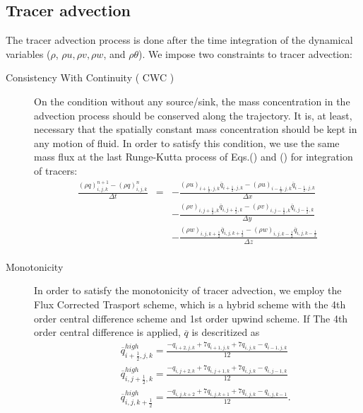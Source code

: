 \subsection{Tracer advection}
The tracer advection process is done after the time integration of 
the dynamical variables ($\rho$, $\rho u,\rho v,\rho w$, and $\rho \theta$).
We impose two constraints to tracer advection:
\begin{description}
\item[Consistency With Continuity ( CWC )]
On the condition without any source/sink,
the mass concentration in the advection process 
should be conserved along the trajectory.
It is, at least,  necessary that 
the spatially constant mass concentration should be kept
in any motion of fluid.
In order to satisfy this condition, we use the same mass flux at the last Runge-Kutta
process of Eqs.() and () for integration of tracers:
\begin{eqnarray}
\frac{\left(\rho q\right)^{n+1}_{i,j,k} - \left(\rho q\right)^{n}_{i,j,k}}{\Delta t}
&=& - \frac{(\rho u)_{i+\frac{1}{2},j,k} \overline{q}_{i+\frac{1}{2},j,k} 
           -(\rho u)_{i-\frac{1}{2},j,k} \overline{q}_{i-\frac{1}{2},j,k}}
     {\Delta x}\nonumber\\
& &  - \frac{(\rho v)_{i,j+\frac{1}{2},k} \overline{q}_{i,j+\frac{1}{2},k} 
           -(\rho v)_{i,j-\frac{1}{2},k} \overline{q}_{i,j-\frac{1}{2},k}}
     {\Delta y}\nonumber\\
& &  - \frac{(\rho w)_{i,j,k+\frac{1}{2}} \overline{q}_{i,j,k+\frac{1}{2}} 
           -(\rho w)_{i,j,k-\frac{1}{2}} \overline{q}_{i,j,k-\frac{1}{2}}}
     {\Delta z}\nonumber\\
\label{eq:tracer_int}
\end{eqnarray}
\item[Monotonicity]
In order to satisfy the monotonicity of tracer advection,
we employ the Flux Corrected Trasport scheme, which is a hybrid scheme 
with the 4th order central difference scheme and 1st order upwind scheme.
If The 4th order central difference is applied, 
$\overline{q}$ is descritized as
\begin{eqnarray}
&& \overline{q}_{i+\frac{1}{2},j,k}^{high} = 
\frac{-q_{i+2,j,k}+7q_{i+1,j,k}+7q_{i,j,k}-q_{i-1,j,k}}{12}\\
&& \overline{q}_{i,j+\frac{1}{2},k}^{high} = 
\frac{-q_{i,j+2,k}+7q_{i,j+1,k}+7q_{i,j,k}-q_{i,j-1,k}}{12}\\
&& \overline{q}_{i,j,k+\frac{1}{2}}^{high} = 
\frac{-q_{i,j,k+2}+7q_{i,j,k+1}+7q_{i,j,k}-q_{i,j,k-1}}{12}.
\end{eqnarray}

\end{description}
